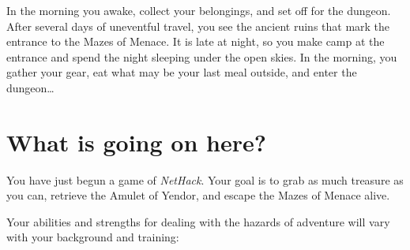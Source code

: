 \documentclass[titlepage]{article}
\begin{document}
\noindent In the morning you awake, collect your belongings, and
set off for the dungeon.  After several days of uneventful
travel, you see the ancient ruins that mark the entrance to the
Mazes of Menace.  It is late at night, so you make camp at the entrance
and spend the night sleeping under the open skies.  In the morning, you
gather your gear, eat what may be your last meal outside, and enter the
dungeon\ldots

\section{What is going on here?}

You have just begun a game of \textit{NetHack}.  Your goal is to grab as much
treasure as you can, retrieve the Amulet of Yendor, and escape the
Mazes of Menace alive.

Your abilities and strengths for dealing with the hazards of adventure
will vary with your background and training:
\end{document}
